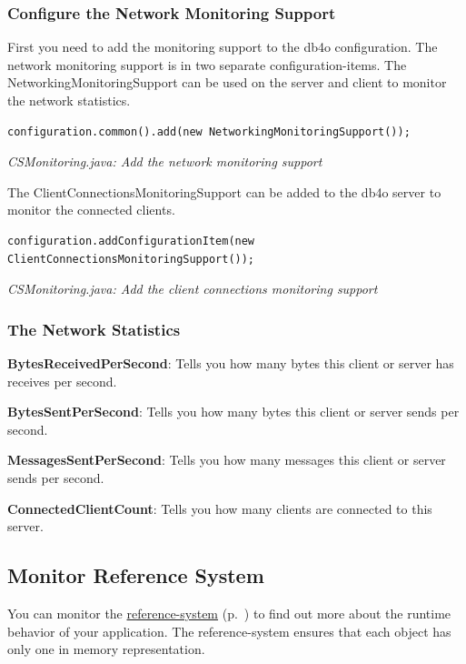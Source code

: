 \subsubsection*{Configure the Network Monitoring Support}

First you need to add the monitoring support to the db4o configuration. The network monitoring support is in two separate configuration-items. The NetworkingMonitoringSupport can be used on the server and client to monitor the network statistics.

\begin{lstlisting}
configuration.common().add(new NetworkingMonitoringSupport());
\end{lstlisting}

{\small\itshape CSMonitoring.java: Add the network monitoring support\par}
\medskip

The ClientConnectionsMonitoringSupport can be added to the db4o server to monitor the connected clients.

\begin{lstlisting}
configuration.addConfigurationItem(new ClientConnectionsMonitoringSupport());
\end{lstlisting}

{\small\itshape CSMonitoring.java: Add the client connections monitoring support\par}
\medskip

\subsubsection*{The Network Statistics}

\textbf{BytesReceivedPerSecond}: Tells you how many bytes this client or server has receives per second.

\textbf{BytesSentPerSecond}: Tells you how many bytes this client or server sends per second.

\textbf{MessagesSentPerSecond}: Tells you how many messages this client or server sends per second.

\textbf{ConnectedClientCount}: Tells you how many clients are connected to this server.

\subsection{Monitor Reference System}
\label{ref:advanced-topics-runtime-statistics-monitor-reference-system}

You can monitor the \hyperref[ref:basics-indentity-concept-reference-cache]{reference-system} (p.~\pageref{ref:basics-indentity-concept-reference-cache}) to find out more about the runtime behavior of your application. The reference-system ensures that each object has only one in memory representation.

